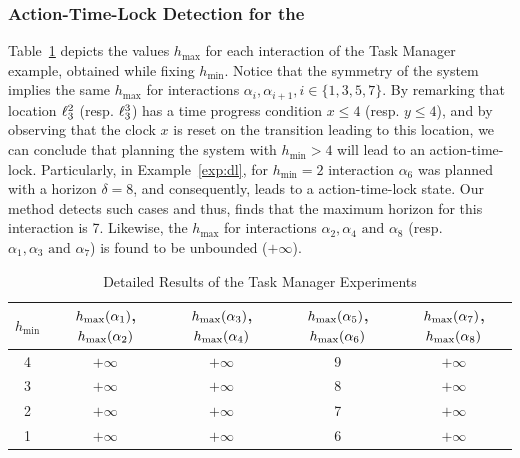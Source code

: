 \subsubsection{Action-Time-Lock Detection for the \lpsabr}

Table~\ref{t:1} depicts the values $h_{\max}$ for each interaction of the Task Manager example, 
obtained while fixing $h_{\min}$.
Notice that the symmetry of the system implies the same $h_{\max}$ for interactions 
$\alpha_i,\alpha_{i+1},i\in\{1,3,5,7\}$. 
By remarking that location $\ell_3^2$ (resp. $\ell_3^3$) has a time progress condition 
$x\le4$ (resp. $y\le4$), and by observing that the clock $x$ is reset on the transition 
leading to this location, we can conclude that planning
the system with $h_{\min}>4$ will lead to an action-time-lock.
Particularly, in Example~\ref{exp:dl}, for $h_{\min}=2$ interaction $\alpha_6$ was planned 
with a horizon $\delta=8$, and consequently, leads to a action-time-lock state. Our method 
detects such cases and thus, finds that the maximum horizon for this interaction is 7. 
Likewise, the $h_{\max}$ for interactions $\alpha_2, \alpha_4\text{ and }\alpha_8$ 
(resp. $\alpha_1, \alpha_3\text{ and }\alpha_7$)
is found to be unbounded ($+\infty$).

\begin{table}[H]
  \caption{Detailed Results of the Task Manager Experiments}\label{t:1}
  \centering
  \begin{tabular}{| c || c | c | c | c |}
    \hline
    $h_{\min}$ & $h_{\max}(\alpha_1)$, $h_{\max}(\alpha_2)$ & $h_{\max}(\alpha_3)$, $h_{\max}(\alpha_4)$ & $h_{\max}(\alpha_5)$, $h_{\max}(\alpha_6)$  & $h_{\max}(\alpha_7)$, $h_{\max}(\alpha_8)$\\ \hline
        4      &                $+\infty$                    &                 $+\infty$                   &                9                     &               $+\infty$                 \\\hline
        3      &                $+\infty$                    &                 $+\infty$                   &                8                     &               $+\infty$                 \\\hline
        2      &                $+\infty$                    &                 $+\infty$                   &                7                     &               $+\infty$                 \\\hline
        1      &                $+\infty$                    &                 $+\infty$                   &                6                     &               $+\infty$                 \\\hline
  \end{tabular}
\end{table}

